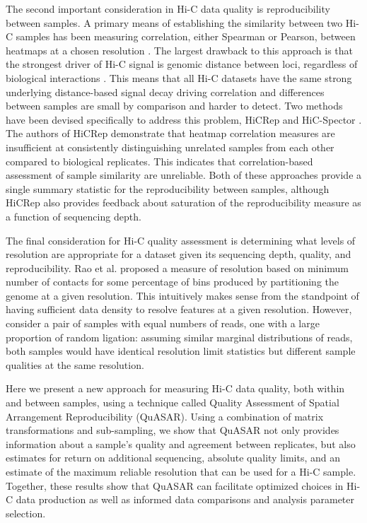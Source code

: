 The second important consideration in Hi-C data quality is reproducibility between samples. A primary means of establishing the similarity between two Hi-C samples has been measuring correlation, either Spearman or Pearson, between heatmaps at a chosen resolution \cite{hou_gene_2012,battulin_comparison_2015,crane_condensin-driven_2015,li_widespread_2015,nagano_comparison_2015,rao_3d_2014}. The largest drawback to this approach is that the strongest driver of Hi-C signal is genomic distance between loci, regardless of biological interactions \cite{lieberman-aiden_comprehensive_2009}. This means that all Hi-C datasets have the same strong underlying distance-based signal decay driving correlation and differences between samples are small by comparison and harder to detect. Two methods have been devised specifically to address this problem, HiCRep \cite{yang_hicrep:_2017} and HiC-Spector \cite{yan_hic-spector:_2017}. The authors of HiCRep demonstrate that heatmap correlation measures are insufficient at consistently distinguishing unrelated samples from each other compared to biological replicates. This indicates that correlation-based assessment of sample similarity are unreliable. Both of these approaches provide a single summary statistic for the reproducibility between samples, although HiCRep also provides feedback about saturation of the reproducibility measure as a function of sequencing depth.

The final consideration for Hi-C quality assessment is determining what levels of resolution are appropriate for a dataset given its sequencing depth, quality, and reproducibility. Rao et al. \cite{rao_3d_2014} proposed a measure of resolution based on minimum number of contacts for some percentage of bins produced by partitioning the genome at a given resolution. This intuitively makes sense from the standpoint of having sufficient data density to resolve features at a given resolution. However, consider a pair of samples with equal numbers of reads, one with a large proportion of random ligation: assuming similar marginal distributions of reads, both samples would have identical resolution limit statistics but different sample qualities at the same resolution.

Here we present a new approach for measuring Hi-C data quality, both within and between samples, using a technique called Quality Assessment of Spatial Arrangement Reproducibility (QuASAR). Using a combination of matrix transformations and sub-sampling, we show that QuASAR not only provides information about a sample's quality and agreement between replicates, but also estimates for return on additional sequencing, absolute quality limits, and an estimate of the maximum reliable resolution that can be used for a Hi-C sample. Together, these results show that QuASAR can facilitate optimized choices in Hi-C data production as well as informed data comparisons and analysis parameter selection.

